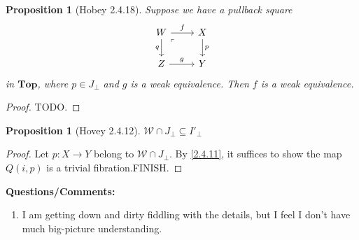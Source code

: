 \documentclass{amsart}
\theoremstyle{plain}
\newtheorem{proposition}[theorem]{Proposition}
\theoremstyle{definition}
\newcommand{\Top}{\mbf{Top}}
\newcommand{\sseq}{\subseteq}
\newcommand{\0}{\mathbf{0}}
\newcommand{\p}{{_\perp}}
\newcommand{\cW}{\mathcal W}
\newcommand{\mbf}[1]{\mathbf{#1}}
\renewcommand{\(}{\left(}
\renewcommand{\)}{\right)}
\begin{document}
\begin{proposition}[Hobey 2.4.18]\label{2.4.18}
  Suppose we have a pullback square
  \[\begin{tikzcd}
    W & X \\
    Z & Y
    \arrow["q"', from=1-1, to=2-1]
    \arrow["g", from=2-1, to=2-2]
    \arrow["f", from=1-1, to=1-2]
    \arrow["p", from=1-2, to=2-2]
    \arrow["\ulcorner"{anchor=center, pos=0.125}, draw=none, from=1-1, to=2-2]
  \end{tikzcd}\]
  in $\Top$, where $p\in J\p$ and $g$ is a weak equivalence. Then $f$ is a weak equivalence.
\end{proposition}
\begin{proof}
  \color{red}TODO.
\end{proof}

\begin{proposition}[Hovey 2.4.12]\label{2.4.12}
  $\cW\cap J\p\sseq I'\p $
\end{proposition}
\begin{proof}
  Let $p:X\to Y$ belong to $\cW\cap J\p$. By \autoref{2.4.11}, it suffices to show the map $Q(i,p)$ is a trivial fibration.\color{red}FINISH.
\end{proof}

\textbf{Questions/Comments:}\begin{enumerate}
  \item I am getting down and dirty fiddling with the details, but I feel I don't have much big-picture understanding.\
\end{enumerate}
\end{document}
